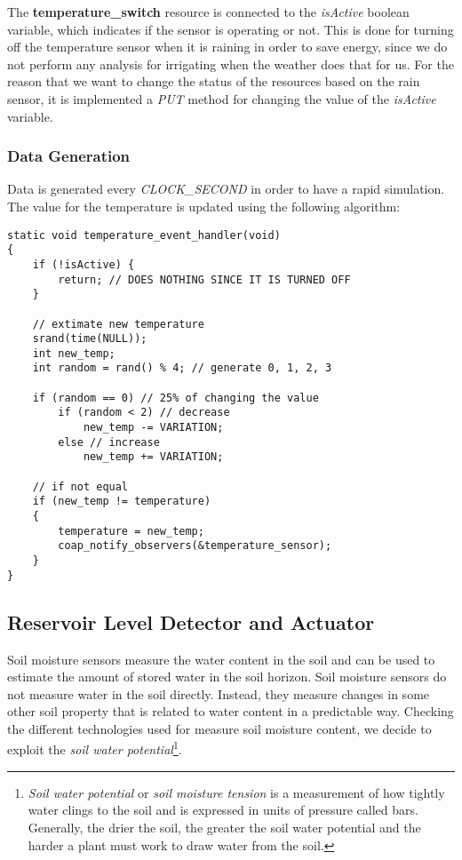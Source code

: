 The \textbf{temperature\_switch} resource is connected to the \textit{isActive} boolean variable, which indicates if the sensor is operating or not. This is done for turning off the temperature sensor when it is raining in order to save energy, since we do not perform any analysis for irrigating when the weather does that for us. For the reason that we want to change the status of the resources based on the rain sensor, it is implemented a \textit{PUT} method for changing the value of the \textit{isActive} variable.

\subsubsection{Data Generation}
Data is generated every \textit{CLOCK\_SECOND} in order to have a rapid simulation. The value for the temperature is updated using the following algorithm:

\begin{lstlisting}
static void temperature_event_handler(void)
{
    if (!isActive) {
        return; // DOES NOTHING SINCE IT IS TURNED OFF
    }
    
    // extimate new temperature
    srand(time(NULL));
    int new_temp;
    int random = rand() % 4; // generate 0, 1, 2, 3
    
    if (random == 0) // 25% of changing the value
        if (random < 2) // decrease
            new_temp -= VARIATION;
        else // increase
            new_temp += VARIATION;

    // if not equal
    if (new_temp != temperature)
    {
        temperature = new_temp;
        coap_notify_observers(&temperature_sensor);
    }
}
\end{lstlisting}



\subsection{Reservoir Level Detector and Actuator}
Soil moisture sensors measure the water content in the soil and can be used to estimate the amount of stored water in the soil horizon. Soil moisture sensors do not measure water in the soil directly. Instead, they measure changes in some other soil property that is related to water content in a predictable way. Checking the different technologies used for measure soil moisture content, we decide to exploit the \textit{soil water potential}\footnote{\textit{Soil water potential} or \textit{soil moisture tension} is a measurement of how tightly water clings to the soil and is expressed in units of pressure called bars. Generally, the drier the soil, the greater the soil water potential and the harder a plant must work to draw water from the soil.}.


